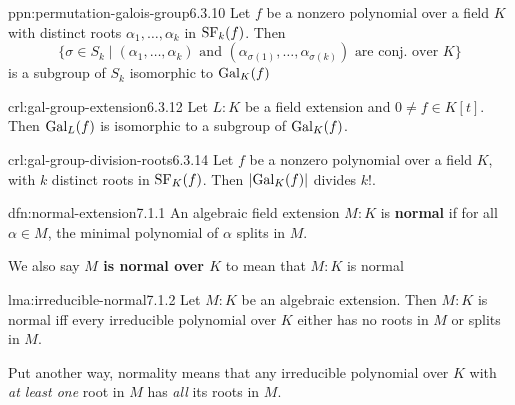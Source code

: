 \documentclass[landscape, 8pt]{extarticle}
\begin{document}
\begin{multicols}{3}
\begin{ppn}{ppn:permutation-galois-group}{6.3.10}
    Let $f$ be a nonzero polynomial over a field $K$ with distinct roots $\alpha_{1},\dots,\alpha_{k}$ in $\mathrm{SF}_{k}(f)$. Then
    \[\{\sigma\in S_{k} \mid (\alpha_{1},\dots,\alpha_{k})\text{ and }(\alpha_{\sigma(1)},\dots,\alpha_{\sigma(k)}) \text{ are conj. over $K$}\}\]
    is a subgroup of $S_{k}$ isomorphic to $\operatorname{Gal}_{K}(f)$
\end{ppn}

\begin{crl}{crl:gal-group-extension}{6.3.12}
    Let $L : K$ be a field extension and $0 \ne f \in K[t]$. Then $\operatorname{Gal}_{L}(f)$ is isomorphic to a subgroup of $\operatorname{Gal}_{K}(f)$.
\end{crl}

\begin{crl}{crl:gal-group-division-roots}{6.3.14}
    Let $f$ be a nonzero polynomial over a field $K$, with $k$ distinct roots in $\mathrm{SF}_{K}(f)$. Then $\lvert \operatorname{Gal}_{K}(f) \rvert$ divides $k!$.
\end{crl}


\begin{dfn}{dfn:normal-extension}{7.1.1}
    An algebraic field extension $M : K$ is \textbf{normal} if for all $\alpha\in M$, the minimal polynomial of $\alpha$ splits in $M$.

    We also say \textbf{$M$ is normal over $K$} to mean that $M : K$ is normal
\end{dfn}

\begin{lma}{lma:irreducible-normal}{7.1.2}
    Let $M : K$ be an algebraic extension. Then $M : K$ is normal iff every irreducible polynomial over $K$ either has no roots in $M$ or splits in $M$.

    Put another way, normality means that any irreducible polynomial over $K$ with \textit{at least one} root in $M$ has \textit{all} its roots in $M$.
\end{lma}


\end{multicols}
\end{document}
